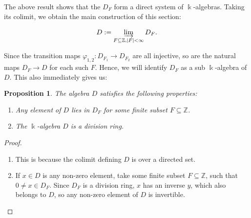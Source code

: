\documentclass{amsart}
\newtheorem{prop}[equation]{Proposition}
\theoremstyle{definition}
\renewcommand{\k}{\Bbbk}
\numberwithin{equation}{section}
\begin{document}
The above result shows that the $D_F$ form a direct system of $\k$-algebras.
Taking its colimit, we obtain the main construction of this section:

\begin{equation}
D := \varinjlim_{F \subseteq \mathbb{Z}, |F| < \infty} D_F.
\end{equation}

Since the transition maps $\varphi_{1,2}:D_{F_1} \to D_{F_2}$ are all injective, so are the natural maps $D_F \to D$ for each such $F$.
Hence, we will identify $D_F$ as a sub $\k$-algebra of $D$.
This also immediately gives us:

\begin{prop}\label{prop:dProperties}
The algebra $D$ satisfies the following properties:
\begin{enumerate}
\item Any element of $D$ lies in $D_F$ for some finite subset $F \subseteq \mathbb{Z}$.
\item The $\k$-algebra $D$ is a division ring.
\end{enumerate}
\end{prop}
\begin{proof}\quad
\begin{enumerate}
\item This is because the colimit defining $D$ is over a directed set.
\item
If $x \in D$ is any non-zero element,
take some finite subset $F \subseteq \mathbb{Z}$,
such that $0\ne x \in D_F$.
Since $D_F$ is a division ring, $x$ has an inverse $y$,
which also belongs to $D$,
so any non-zero element of $D$ is invertible.
\end{enumerate}
\end{proof}
\end{document}
